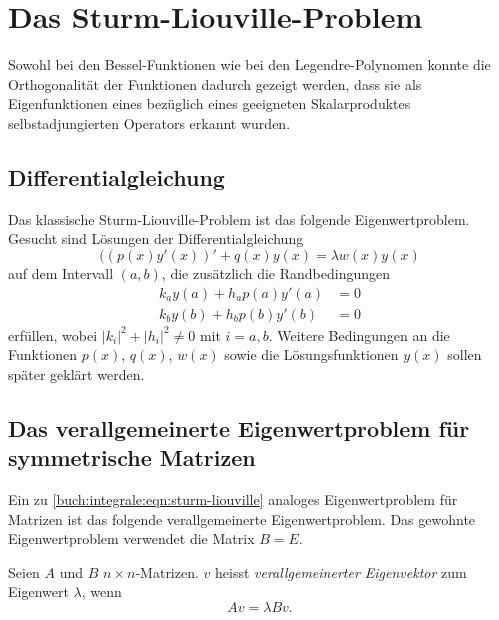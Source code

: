 %
%
%
\section{Das Sturm-Liouville-Problem
\label{buch:integrale:subsection:sturm-liouville-problem}}
Sowohl bei den Bessel-Funktionen wie bei den Legendre-Polynomen
konnte die Orthogonalität der Funktionen dadurch gezeigt werden,
dass sie als Eigenfunktionen eines bezüglich eines geeigneten
Skalarproduktes selbstadjungierten Operators erkannt wurden.

%
%
\subsection{Differentialgleichung}
Das klassische Sturm-Liouville-Problem ist das folgende Eigenwertproblem.
Gesucht sind Lösungen der Differentialgleichung
\begin{equation}
((p(x)y'(x))' + q(x)y(x) = \lambda w(x) y(x)
\label{buch:integrale:eqn:sturm-liouville}
\end{equation}
auf dem Intervall $(a,b)$, die zusätzlich die Randbedingungen
\begin{equation}
\begin{aligned}
k_a y(a) + h_a p(a) y'(a) &= 0 \\
k_b y(b) + h_b p(b) y'(b) &= 0
\end{aligned}
\label{buch:integrale:sturm:randbedingung}
\end{equation}
erfüllen, wobei $|k_i|^2 + |h_i|^2\ne 0$ mit $i=a,b$.
Weitere Bedingungen an die Funktionen $p(x)$, $q(x)$, $w(x)$  sowie die
Lösungsfunktionen $y(x)$ sollen später geklärt werden.

%
%
\subsection{Das verallgemeinerte Eigenwertproblem für symmetrische Matrizen}
Ein zu \eqref{buch:integrale:eqn:sturm-liouville} analoges Eigenwertproblem
für Matrizen ist das folgende verallgemeinerte Eigenwertproblem.
Das gewohnte Eigenwertproblem verwendet die Matrix $B=E$.

\begin{definition}
%
%
\label{buch:orthogonal:sturm:verallgemeinerter-eigenvektor}
Seien $A$ und $B$ $n\times n$-Matrizen.
$v$ heisst {\em verallgemeinerter Eigenvektor} zum Eigenwert $\lambda$,
wenn
\[
Av = \lambda Bv.
\]
\end{definition}

